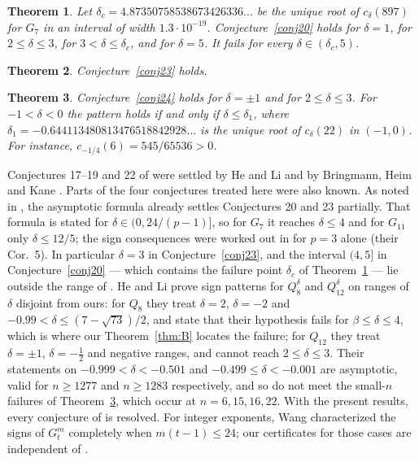 \documentclass[11pt]{amsart}
\newtheorem{theorem}{Theorem}[section]
\theoremstyle{remark}
\theoremstyle{definition}
\begin{document}
\begin{theorem}\label{thm:20}
Let $\delta_c=4.87350758538673426336\ldots$ be the unique root of $c_\delta(897)$ for $G_7$ in an interval of width $1.3\cdot10^{-19}$. Conjecture~\ref{conj20} holds for $\delta=1$, for $2\le\delta\le3$, for $3<\delta\le\delta_c$, and for $\delta=5$. It fails for every $\delta\in(\delta_c,5)$.
\end{theorem}

\begin{theorem}\label{thm:23}
Conjecture~\ref{conj23} holds.
\end{theorem}

\begin{theorem}\label{thm:24}
Conjecture~\ref{conj24} holds for $\delta=\pm1$ and for $2\le\delta\le3$. For $-1<\delta<0$ the pattern holds if and only if $\delta\le\delta_1$, where $\delta_1=-0.644113480813476518842928\ldots$ is the unique root of $c_\delta(22)$ in $(-1,0)$. For instance, $c_{-1/4}(6)=545/65536>0$.
\end{theorem}

Conjectures 17--19 and 22 of \cite{SZ} were settled by He and Li \cite{HL} and by Bringmann, Heim and Kane \cite{BHK}. Parts of the four conjectures treated here were also known. As noted in \cite{HL}, the asymptotic formula \cite[Thm.~3]{SZ} already settles Conjectures 20 and 23 partially. That formula is stated for $\delta\in(0,24/(p-1)]$, so for $G_7$ it reaches $\delta\le4$ and for $G_{11}$ only $\delta\le12/5$; the sign consequences were worked out in \cite{SZ} for $p=3$ alone (their Cor.~5). In particular $\delta=3$ in Conjecture~\ref{conj23}, and the interval $(4,5]$ in Conjecture~\ref{conj20} --- which contains the failure point $\delta_c$ of Theorem~\ref{thm:20} --- lie outside the range of \cite[Thm.~3]{SZ}. He and Li \cite{HL} prove sign patterns for $Q_8^\delta$ and $Q_{12}^\delta$ on ranges of $\delta$ disjoint from ours: for $Q_8$ they treat $\delta=2$, $\delta=-2$ and $-0.99<\delta\le(7-\sqrt{73})/2$, and state that their hypothesis fails for $\beta\le\delta\le4$, which is where our Theorem~\ref{thm:B} locates the failure; for $Q_{12}$ they treat $\delta=\pm1$, $\delta=-\tfrac12$ and negative ranges, and cannot reach $2\le\delta\le3$. Their statements on $-0.999<\delta<-0.501$ and $-0.499\le\delta<-0.001$ are asymptotic, valid for $n\ge1277$ and $n\ge1283$ respectively, and so do not meet the small-$n$ failures of Theorem~\ref{thm:24}, which occur at $n=6,15,16,22$. With the present results, every conjecture of \cite[Appendix A]{SZ} is resolved. For integer exponents, Wang \cite{W} characterized the signs of $G_t^m$ completely when $m(t-1)\le24$; our certificates for those cases are independent of \cite{W}.
\end{document}
